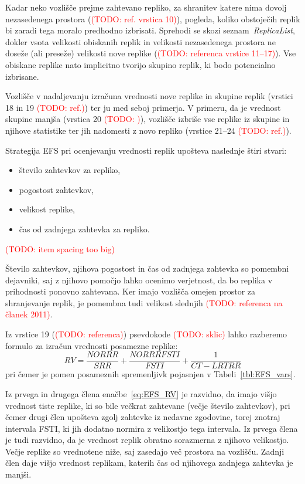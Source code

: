 \documentclass[a4paper, 12pt]{book}
\newcommand{\TODO}[1]{\textcolor{red}{(TODO: #1)}}
\begin{document}
Kadar neko vozlišče prejme zahtevano repliko, za shranitev katere nima dovolj
nezasedenega prostora (\TODO{ref. vrstica 10}), pogleda, koliko
obstoječih replik bi zaradi tega moralo predhodno izbrisati. Sprehodi se skozi
seznam~\textit{\mbox{ReplicaList}}, dokler vsota velikosti obiskanih replik in
velikosti nezasedenega prostora ne doseže (ali preseže) velikosti nove replike
(\TODO{referenca vrstice 11--17}). Vse obiskane replike nato implicitno
tvorijo skupino replik, ki bodo potencialno izbrisane.

Vozlišče v nadaljevanju izračuna vrednosti nove replike in skupine replik
(vrstici 18 in 19 \TODO{ref.}) ter ju med seboj primerja. V primeru, da je
vrednost skupine manjša (vrstica 20 \TODO{}), vozlišče izbriše vse replike
iz skupine in njihove statistike ter jih nadomesti z novo repliko
(vrstice 21--24 \TODO{ref.}).

Strategija EFS pri ocenjevanju vrednosti replik upošteva naslednje štiri
stvari:

\begin{itemize}
  \item število zahtevkov za repliko,
  \item pogostost zahtevkov,
  \item velikost replike,
  \item čas od zadnjega zahtevka za repliko.
\end{itemize}

\TODO{item spacing too big}

Število zahtevkov, njihova pogostost in čas od zadnjega zahtevka so pomembni
dejavniki, saj z njihovo pomočjo lahko ocenimo verjetnost, da bo replika
v prihodnosti ponovno zahtevana. Ker imajo vozlišča omejen prostor za
shranjevanje replik, je pomembna tudi velikost slednjih
\TODO{referenca na članek 2011}.

\begin{samepage}
Iz vrstice 19 (\TODO{referenca}) psevdokode \TODO{sklic} lahko razberemo
formulo za izračun vrednosti posamezne replike:
\begin{equation}
  \mathit{RV} = \frac{\mathit{NORRR}}{\mathit{SRR}} +
                      \frac{\mathit{NORRRFSTI}}{\mathit{FSTI}} +
                      \frac{1}{\mathit{CT} - \mathit{LRTRR}}
  \label{eq:EFS_RV}
\end{equation}
pri čemer je pomen posameznih spremenljivk pojasnjen v
Tabeli~\ref{tbl:EFS_vars}.
\end{samepage}

Iz prvega in drugega člena enačbe~\eqref{eq:EFS_RV} je razvidno, da imajo
višjo vrednost tiste replike, ki so bile večkrat zahtevane (večje število
zahtevkov), pri čemer drugi člen upošteva zgolj zahtevke iz nedavne zgodovine,
torej znotraj intervala FSTI, ki jih dodatno normira z velikostjo tega
intervala. Iz prvega člena je tudi razvidno, da je vrednost replik obratno
sorazmerna z njihovo velikostjo. Večje replike so vrednotene niže, saj
zasedajo več prostora na vozlišču. Zadnji člen daje višjo vrednost replikam,
katerih čas od njihovega zadnjega zahtevka je manjši.
\end{document}
